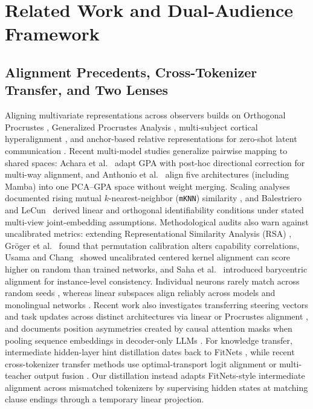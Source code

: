 \documentclass[conference]{IEEEtran}
\begin{document}
\section{Related Work and Dual-Audience Framework}
\label{sec:related}
\subsection{Alignment Precedents, Cross-Tokenizer Transfer, and Two Lenses}
Aligning multivariate representations across observers builds on Orthogonal Procrustes \cite{schonemann1966procrustes}, Generalized Procrustes Analysis \cite{gower1975gpa}, multi-subject cortical hyperalignment \cite{haxby2011hyperalignment}, and anchor-based relative representations for zero-shot latent communication \cite{moschella2023relative}. Recent multi-model studies generalize pairwise mapping to shared spaces: Achara et al.~\cite{achara2026multiway} adapt GPA with post-hoc directional correction for multi-way alignment, and Anthonio et al.~\cite{anthonio2026five} align five architectures (including Mamba) into one PCA--GPA space without weight merging. Scaling analyses documented rising mutual $k$-nearest-neighbor (\texttt{mKNN}) similarity \cite{huh2024platonic}, and Balestriero and LeCun~\cite{balestriero2026proving} derived linear and orthogonal identifiability conditions under stated multi-view joint-embedding assumptions. Methodological audits also warn against uncalibrated metrics: extending Representational Similarity Analysis (RSA) \cite{kriegeskorte2008rsa}, Gr\"oger et al.~\cite{groger2026revisiting} found that permutation calibration alters capability correlations, Usama and Chang~\cite{usama2026convergence} showed uncalibrated centered kernel alignment can score higher on random than trained networks, and Saha et al.~\cite{saha2026barycentric} introduced barycentric alignment for instance-level consistency. Individual neurons rarely match across random seeds \cite{gurnee2024universal}, whereas linear subspaces align reliably across models \cite{lan2024quantifying} and monolingual networks \cite{zhou2026crosslingual}. Recent work also investigates transferring steering vectors and task updates across distinct architectures via linear or Procrustes alignment \cite{agarwal2026crossarch,rinaldi2026theseus}, and documents position asymmetries created by causal attention masks when pooling sequence embeddings in decoder-only LLMs \cite{behnamghader2024llm2vec,springer2025repetition}. For knowledge transfer, intermediate hidden-layer hint distillation dates back to FitNets \cite{romero2015fitnets}, while recent cross-tokenizer transfer methods use optimal-transport logit alignment \cite{boizard2025uld} or multi-teacher output fusion \cite{wan2024fusellm}. Our distillation instead adapts FitNets-style intermediate alignment across mismatched tokenizers by supervising hidden states at matching clause endings through a temporary linear projection.
\end{document}
